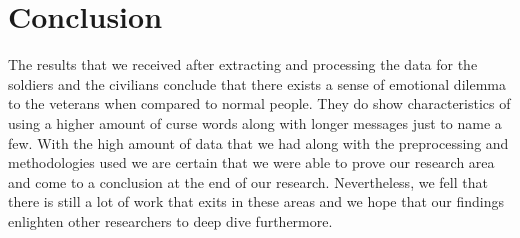 \section{Conclusion}

The results that we received after extracting and processing the data for the soldiers and the civilians conclude that there exists a sense of emotional dilemma to the veterans when compared to normal people. They do show characteristics of using a higher amount of curse words along with longer messages just to name a few. With the high amount of data that we had along with the preprocessing and methodologies used we are certain that we were able to prove our research area and come to a conclusion at the end of our research. Nevertheless, we fell that there is still a lot of work that exits in these areas and we hope that our findings enlighten other researchers to deep dive furthermore.
